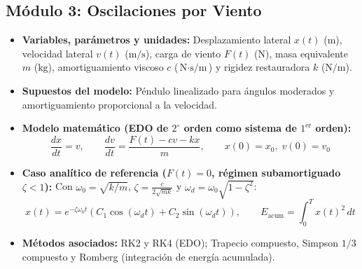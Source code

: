 \documentclass[a4paper,12pt]{article}
\begin{document}
\subsection{Módulo 3: Oscilaciones por Viento}
\begin{itemize}
    \item \textbf{Variables, parámetros y unidades:} Desplazamiento lateral $x(t)$ ($\text{m}$), velocidad lateral $v(t)$ ($\text{m/s}$), carga de viento $F(t)$ ($\text{N}$), masa equivalente $m$ ($\text{kg}$), amortiguamiento viscoso $c$ ($\text{N}\cdot\text{s/m}$) y rigidez restauradora $k$ ($\text{N/m}$).
    \item \textbf{Supuestos del modelo:} Péndulo linealizado para ángulos moderados y amortiguamiento proporcional a la velocidad.
    \item \textbf{Modelo matemático (EDO de $2^\circ$ orden como sistema de $1^{\text{er}}$ orden):}
    \begin{equation}
        \frac{dx}{dt} = v, \qquad \frac{dv}{dt} = \frac{F(t) - c v - k x}{m}, \qquad x(0)=x_0,\; v(0)=v_0
    \end{equation}
    \item \textbf{Caso analítico de referencia ($F(t)=0$, régimen subamortiguado $\zeta < 1$):}
    Con $\omega_0 = \sqrt{k/m}$, $\zeta = \frac{c}{2\sqrt{mk}}$ y $\omega_d = \omega_0\sqrt{1-\zeta^2}$:
    \begin{equation}
        x(t) = e^{-\zeta \omega_0 t}\left(C_1 \cos(\omega_d t) + C_2 \sin(\omega_d t)\right), \qquad E_{\text{acum}} = \int_{0}^{T} x(t)^2\,dt
    \end{equation}
    \item \textbf{Métodos asociados:} RK2 y RK4 (EDO); Trapecio compuesto, Simpson $1/3$ compuesto y Romberg (integración de energía acumulada).
\end{itemize}
\end{document}
